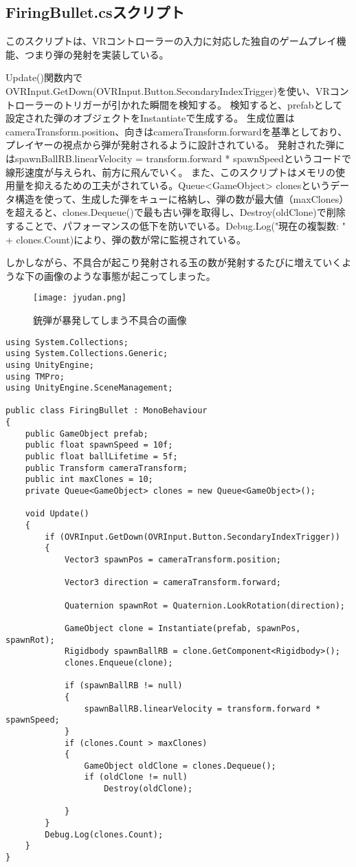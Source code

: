 \documentclass{jlreq}
\begin{document}
\subsection{FiringBullet.csスクリプト}
このスクリプトは、VRコントローラーの入力に対応した独自のゲームプレイ機能、つまり弾の発射を実装している。

Update()関数内でOVRInput.GetDown(OVRInput.Button.SecondaryIndexTrigger)を使い、VRコントローラーのトリガーが引かれた瞬間を検知する。
検知すると、prefabとして設定された弾のオブジェクトをInstantiateで生成する。
生成位置はcameraTransform.position、向きはcameraTransform.forwardを基準としており、プレイヤーの視点から弾が発射されるように設計されている。
発射された弾にはspawnBallRB.linearVelocity = transform.forward * spawnSpeedというコードで線形速度が与えられ、前方に飛んでいく。
また、このスクリプトはメモリの使用量を抑えるための工夫がされている。Queue<GameObject> clonesというデータ構造を使って、生成した弾をキューに格納し、弾の数が最大値（maxClones）を超えると、clones.Dequeue()で最も古い弾を取得し、Destroy(oldClone)で削除することで、パフォーマンスの低下を防いでいる。Debug.Log("現在の複製数: " + clones.Count)により、弾の数が常に監視されている。

しかしながら、不具合が起こり発射される玉の数が発射するたびに増えていくような下の画像のような事態が起こってしまった。
\begin{figure}[H]
    \centering
    \texttt{[image: jyudan.png]}
    \caption{銃弾が暴発してしまう不具合の画像}
    \label{fig:kadai1}
\end{figure}
\begin{lstlisting}
using System.Collections;
using System.Collections.Generic;
using UnityEngine;
using TMPro;
using UnityEngine.SceneManagement;

public class FiringBullet : MonoBehaviour
{
    public GameObject prefab;
    public float spawnSpeed = 10f;
    public float ballLifetime = 5f;
    public Transform cameraTransform;
    public int maxClones = 10;
    private Queue<GameObject> clones = new Queue<GameObject>();

    void Update()
    {
        if (OVRInput.GetDown(OVRInput.Button.SecondaryIndexTrigger))
        {
            Vector3 spawnPos = cameraTransform.position;

            Vector3 direction = cameraTransform.forward;

            Quaternion spawnRot = Quaternion.LookRotation(direction);

            GameObject clone = Instantiate(prefab, spawnPos, spawnRot);
            Rigidbody spawnBallRB = clone.GetComponent<Rigidbody>();
            clones.Enqueue(clone);
            
            if (spawnBallRB != null)
            {
                spawnBallRB.linearVelocity = transform.forward * spawnSpeed;
            }
            if (clones.Count > maxClones)
            {
                GameObject oldClone = clones.Dequeue();
                if (oldClone != null)
                    Destroy(oldClone);
                
            }
        }
        Debug.Log(clones.Count);
    }
}
\end{lstlisting}
\end{document}
